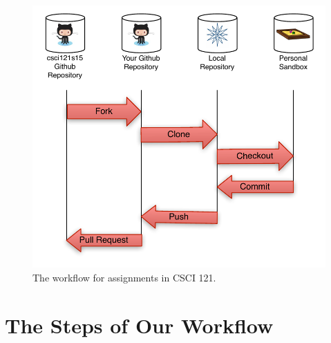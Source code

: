 \documentclass[11pt]{article}
\begin{document}
\begin{figure}[H]
\centerline{\includegraphics[scale=.7]{workflow}}
\caption{The workflow for assignments in CSCI 121.}
\label{workflow}
\end{figure}

\section*{The Steps of Our Workflow}
\end{document}
